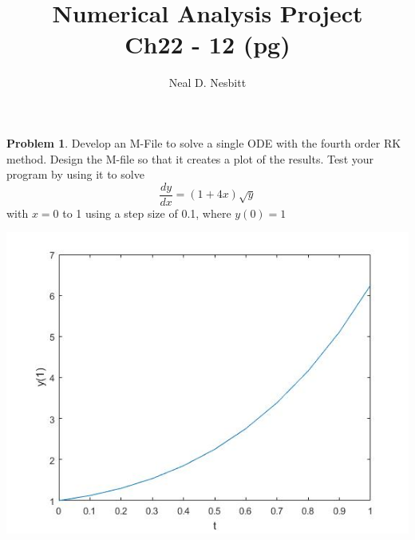 \documentclass{article}
\title{Numerical Analysis Project\\
Ch22 - 12 (pg)\\}
\author{Neal D. Nesbitt}
\begin{document}
\maketitle

\theoremstyle{definition}
\newtheorem{problem}{Problem}[section]
\newtheorem{solution}{Solution}[problem]
\renewcommand*{\thesolution}{\theproblem.\alph{solution}}


\setcounter{section}{21}
\section{}

\setcounter{problem}{11}
\begin{problem}
Develop an M-File to solve a single ODE with the fourth order RK method. Design the M-file so that it creates a plot of the results. Test your program by using it to solve
\[ \frac{dy}{dx} = (1+4x)\sqrt{y} \]
with $x = 0$ to 1 using a step size of 0.1, where $y(0)=1$
\end{problem}

\includegraphics[width=\linewidth]{Project.jpg}
\end{document}

